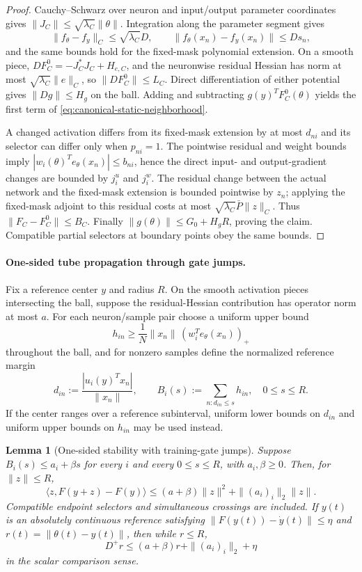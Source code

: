 \documentclass[10pt]{article}
\newtheorem{lemma}[theorem]{Lemma}
\theoremstyle{remark}\newtheorem{remark}[theorem]{Remark}
\begin{document}
\begin{proof}
Cauchy--Schwarz over neuron and input/output parameter coordinates gives
$\|J_C\|\le\sqrt{\lambda_C}\|\theta\|$. Integration along the parameter
segment gives
\[
 \|f_\theta-f_y\|_C\le\sqrt{\lambda_C}D,
 \qquad
 \|f_\theta(x_n)-f_y(x_n)\|\le Ds_n,
\]
and the same bounds hold for the fixed-mask polynomial extension. On a
smooth piece,
$DF_C^0=-J_C^*J_C+H_{e,C}$, and the neuronwise residual Hessian has norm at
most $\sqrt{\lambda_C}\|e\|_C$, so $\|DF_C^0\|\le L_C$. Direct
differentiation of either potential gives $\|Dg\|\le H_g$ on the ball.
Adding and subtracting $g(y)^TF_C^0(\theta)$ yields the first term of
\eqref{eq:canonical-static-neighborhood}.

A changed activation differs from its fixed-mask extension by at most
$d_{ni}$ and its selector can differ only when $p_{ni}=1$. The pointwise
residual and weight bounds imply
$|w_i(\theta)^Te_\theta(x_n)|\le b_{ni}$, hence the direct input- and
output-gradient changes are bounded by $j_i^u$ and $j_i^w$. The residual
change between the actual network and the fixed-mask extension is bounded
pointwise by $z_n$; applying the fixed-mask adjoint to this residual costs
at most $\sqrt{\lambda_C}\bar P\|z\|_C$. Thus
$\|F_C-F_C^0\|\le B_C$. Finally
$\|g(\theta)\|\le G_0+H_gR$, proving the claim. Compatible partial selectors
at boundary points obey the same bounds.
\end{proof}

\paragraph{One-sided tube propagation through gate jumps.}
Fix a reference center $y$ and radius $R$. On the smooth activation pieces
intersecting the ball, suppose the residual-Hessian contribution has
operator norm at most $a$. For each neuron/sample pair choose a uniform
upper bound
\[
 h_{in}\ge \frac1N\|x_n\|\,(w_i^Te_\theta(x_n))_+
\]
throughout the ball, and for nonzero samples define the normalized reference
margin
\[
 d_{in}:=\frac{|u_i(y)^Tx_n|}{\|x_n\|},
 \qquad
 B_i(s):=\sum_{n:d_{in}\le s}h_{in},\quad 0\le s\le R.
\]
If the center ranges over a reference subinterval, uniform lower bounds on
$d_{in}$ and uniform upper bounds on $h_{in}$ may be used instead.

\begin{lemma}[One-sided stability with training-gate jumps]
\label{lem:canonical-tube-stability}
Suppose
$B_i(s)\le a_i+\beta s$ for every $i$ and every $0\le s\le R$, with
$a_i,\beta\ge0$. Then, for $\|z\|\le R$,
\begin{equation}
 \langle z,F(y+z)-F(y)\rangle
 \le(a+\beta)\|z\|^2+\|(a_i)_i\|_2\|z\|.
 \label{eq:canonical-one-sided-stability}
\end{equation}
Compatible endpoint selectors and simultaneous crossings are included. If
$y(t)$ is an absolutely continuous reference satisfying
$\|F(y(t))-\dot y(t)\|\le\eta$ and
$r(t)=\|\theta(t)-y(t)\|$, then while $r\le R$,
\begin{equation}
 D^+r\le(a+\beta)r+\|(a_i)_i\|_2+\eta
 \label{eq:canonical-radius-ode}
\end{equation}
in the scalar comparison sense.
\end{lemma}
\end{document}
